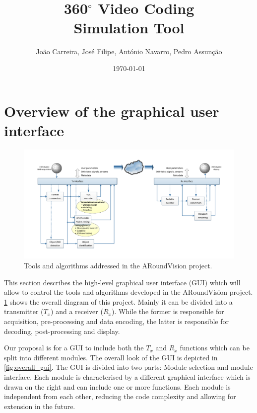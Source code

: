 \documentclass{article}
\title{\textbf{360$^\circ$ Video Coding}\\ \textbf{Simulation Tool}}
\author{João Carreira, José Filipe, António Navarro, Pedro Assunção}
\date{\today}
\begin{document}
\maketitle
\tableofcontents

\section{Overview of the graphical user interface}

\begin{figure}[ht]
    \centering
    \includegraphics[width=1\textwidth]{ARoundVision_Framework_Diagram_v2.pdf}
    \caption{Tools and algorithms addressed in the ARoundVision project.}
    \label{fig:scheme}
\end{figure}

This section describes the high-level graphical user interface (GUI) which will allow to control the tools and algorithms developed in the ARoundVision project. \cref{fig:scheme} shows the overall diagram of this project. Mainly it can be divided into a transmitter ($T_x$) and a receiver ($R_x$). While the former is responsible for acquisition, pre-processing and data encoding, the latter is responsible for decoding, post-processing and display.

Our proposal is for a GUI to include both the $T_x$ and $R_x$ functions which can be split into different modules. The overall look of the GUI is depicted in \cref{fig:overall_gui}. The GUI is divided into two parts: Module selection and module interface. Each module is characterised by a different graphical interface which is drawn on the right and can include one or more functions. Each module is independent from each other, reducing the code complexity and allowing for extension in the future.
\end{document}
